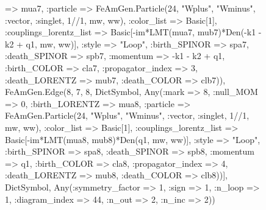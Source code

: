 \documentclass{revtex4}
\begin{document}
\begin{figure}[!htb]
\begin{center}
{=> mua7, :particle => FeAmGen.Particle(24, "Wplus", "Wminus", :vector, :singlet, 1//1, mw, ww), :color_list => Basic[1], :couplings_lorentz_list => Basic[-im*LMT(mua7, mub7)*Den(-k1 - k2 + q1, mw, ww)], :style => "Loop", :birth_SPINOR => spa7, :death_SPINOR => spb7, :momentum => -k1 - k2 + q1, :birth_COLOR => cla7, :propagator_index => 3, :death_LORENTZ => mub7, :death_COLOR => clb7)), FeAmGen.Edge(8, 7, 8, Dict{Symbol, Any}(:mark => 8, :null_MOM => 0, :birth_LORENTZ => mua8, :particle => FeAmGen.Particle(24, "Wplus", "Wminus", :vector, :singlet, 1//1, mw, ww), :color_list => Basic[1], :couplings_lorentz_list => Basic[-im*LMT(mua8, mub8)*Den(q1, mw, ww)], :style => "Loop", :birth_SPINOR => spa8, :death_SPINOR => spb8, :momentum => q1, :birth_COLOR => cla8, :propagator_index => 4, :death_LORENTZ => mub8, :death_COLOR => clb8))], Dict{Symbol, Any}(:symmetry_factor => 1, :sign => 1, :n_loop => 1, :diagram_index => 44, :n_out => 2, :n_inc => 2)) 
}
\end{center}
\end{figure}
\end{document}

